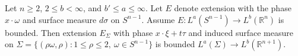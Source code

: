 Let \(n\ge2\), \(2\le b<\infty\), and \(b'\le a\le\infty\). Let \(E\) denote extension with the phase \(x\cdot\omega\) and surface measure \(d\sigma\) on \(S^{n-1}\). Assume \(E:L^a(S^{n-1})\to L^b(\mathbb R^n)\) is bounded. Then extension \(E_\Sigma\) with phase \(x\cdot\xi+t\tau\) and induced surface measure on \(\Sigma=\{(\rho\omega,\rho):1\le\rho\le2,\ \omega\in S^{n-1}\}\) is bounded \(L^a(\Sigma)\to L^b(\mathbb R^{n+1})\).
